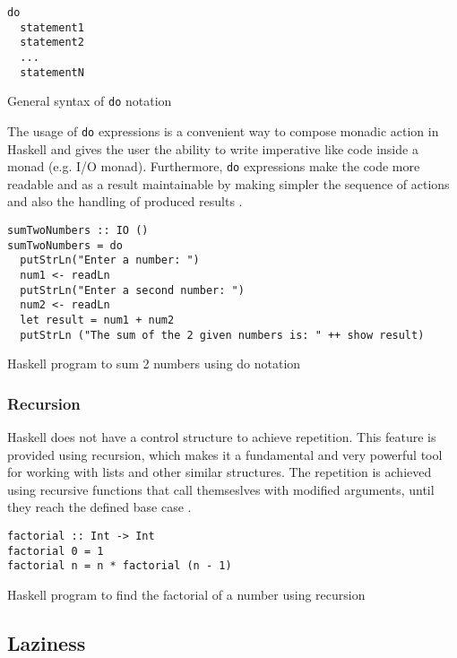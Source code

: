 \documentclass[a4paper, titlepage, twoside]{article}
\begin{document}
\begin{listing}[htbp]
\begin{verbatim}
do
  statement1
  statement2
  ...
  statementN
\end{verbatim}
\caption{General syntax of \texttt{do} notation}
\end{listing}

The usage of \texttt{do} expressions is a convenient way to compose monadic action in Haskell and gives the user the ability to write imperative like code inside a monad (e.g. I/O monad). Furthermore, \texttt{do} expressions make the code more readable and as a result maintainable by making simpler the sequence of actions and also the handling of produced results \autocite{kremerCPSC449Programming2015}.

\begin{listing}[htbp]
\begin{verbatim}
sumTwoNumbers :: IO ()
sumTwoNumbers = do
  putStrLn("Enter a number: ")
  num1 <- readLn
  putStrLn("Enter a second number: ")
  num2 <- readLn
  let result = num1 + num2
  putStrLn ("The sum of the 2 given numbers is: " ++ show result)
\end{verbatim}
\caption{Haskell program to sum 2 numbers using do notation \autocite[chapter 10.2]{wikibooksHaskellWikibooksFree2022}}
\end{listing}

\subsubsection{Recursion}
\label{sec:org5b13427}

Haskell does not have a control structure to achieve repetition. This feature is provided using recursion, which makes it a fundamental and very powerful tool for working with lists and other similar structures. The repetition is achieved using recursive functions that call themseslves with modified arguments, until they reach the defined base case \autocite{kremerCPSC449Programming2015}.

\begin{listing}[htbp]
\begin{verbatim}
factorial :: Int -> Int
factorial 0 = 1
factorial n = n * factorial (n - 1)
\end{verbatim}
\caption{Haskell program to find the factorial of a number using recursion}
\end{listing}

\subsection{Laziness}
\label{sec:orgb548808}
\end{document}
